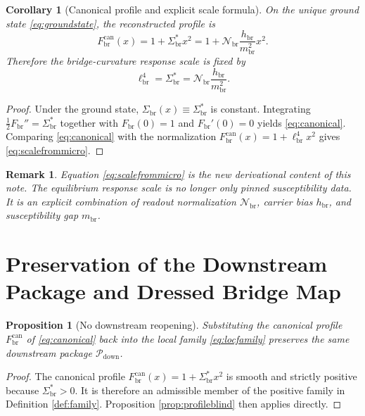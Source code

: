 \documentclass[11pt]{article}
\newcommand{\CurvScale}{\ell_{\mathrm{br}}}
\newcommand{\CurvProfile}{F_{\mathrm{br}}}
\newcommand{\CurvProfileCan}{F_{\mathrm{br}}^{\mathrm{can}}}
\newcommand{\DownPkg}{\mathscr P_{\mathrm{down}}}
\newcommand{\RespSus}{\Sigma_{\mathrm{br}}}
\newcommand{\RespSusEq}{\Sigma_{\mathrm{br}}^{\ast}}
\newcommand{\RespNorm}{\mathcal N_{\mathrm{br}}}
\newcommand{\RespGap}{m_{\mathrm{br}}}
\newcommand{\RespBias}{h_{\mathrm{br}}}
\newtheorem{proposition}{Proposition}
\newtheorem{remark}{Remark}
\newtheorem{corollary}{Corollary}
\begin{document}
\begin{corollary}[Canonical profile and explicit scale formula]
\label{cor:canonical}
On the unique ground state \eqref{eq:groundstate}, the reconstructed profile is
\begin{equation}
\CurvProfileCan(x)=1+\RespSusEq x^2
=
1+\RespNorm\frac{\RespBias}{\RespGap^2}x^2.
\label{eq:canonical}
\end{equation}
Therefore the bridge-curvature response scale is fixed by
\begin{equation}
\CurvScale^4=\RespSusEq=\RespNorm\frac{\RespBias}{\RespGap^2}.
\label{eq:scalefrommicro}
\end{equation}
\end{corollary}

\begin{proof}
Under the ground state, \(\RespSus(x)\equiv\RespSusEq\) is constant. Integrating \(\frac12\CurvProfile''=\RespSusEq\) together with \(\CurvProfile(0)=1\) and \(\CurvProfile'(0)=0\) yields \eqref{eq:canonical}. Comparing \eqref{eq:canonical} with the normalization \(\CurvProfileCan(x)=1+\CurvScale^4x^2\) gives \eqref{eq:scalefrommicro}.
\end{proof}

\begin{remark}
Equation \eqref{eq:scalefrommicro} is the new derivational content of this note. The equilibrium response scale is no longer only pinned susceptibility data. It is an explicit combination of readout normalization \(\RespNorm\), carrier bias \(\RespBias\), and susceptibility gap \(\RespGap\).
\end{remark}

\section{Preservation of the Downstream Package and Dressed Bridge Map}

\begin{proposition}[No downstream reopening]
\label{prop:noreopen}
Substituting the canonical profile \(\CurvProfileCan\) of \eqref{eq:canonical} back into the local family \eqref{eq:locfamily} preserves the same downstream package \(\DownPkg\).
\end{proposition}

\begin{proof}
The canonical profile \(\CurvProfileCan(x)=1+\RespSusEq x^2\) is smooth and strictly positive because \(\RespSusEq>0\). It is therefore an admissible member of the positive family in Definition \ref{def:family}. Proposition \ref{prop:profileblind} then applies directly.
\end{proof}
\end{document}
